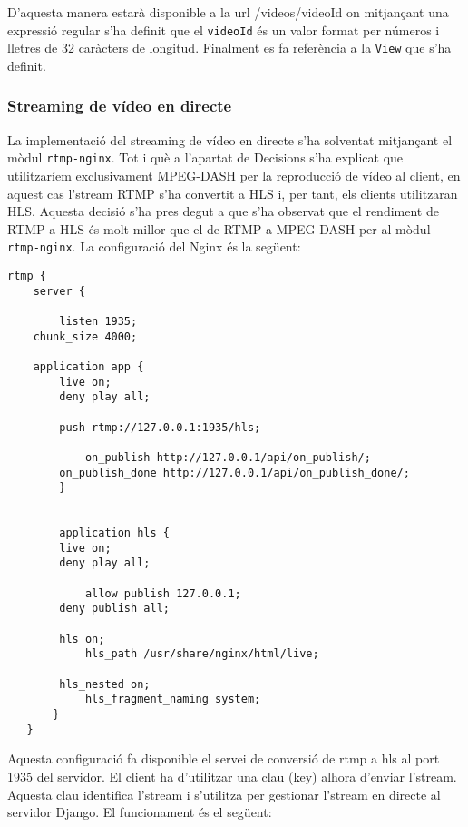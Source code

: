 \documentclass[12pt, titlepage]{article}
\begin{document}
D'aquesta manera estarà disponible a la url /videos/{videoId} on mitjançant una
expressió regular s'ha definit que el \verb|videoId| és un valor format per números
i lletres de 32 caràcters de longitud. Finalment es fa referència a la \verb|View| que
s'ha definit.

\subsubsection{Streaming de vídeo en directe}

La implementació del streaming de vídeo en directe s'ha solventat mitjançant el mòdul
\verb|rtmp-nginx|. Tot i què a l'apartat de Decisions s'ha explicat que utilitzaríem
exclusivament MPEG-DASH per la reproducció de vídeo al client, en aquest cas l'stream
RTMP s'ha convertit a HLS i, per tant, els clients utilitzaran HLS. Aquesta decisió
s'ha pres degut a que s'ha observat que el rendiment de RTMP a HLS és molt millor
que el de RTMP a MPEG-DASH per al mòdul \verb|rtmp-nginx|. La configuració del
Nginx és la següent:

\begin{lstlisting}[breaklines]
rtmp {
    server {

        listen 1935;
	chunk_size 4000;

	application app {
	    live on;
	    deny play all;

	    push rtmp://127.0.0.1:1935/hls;

            on_publish http://127.0.0.1/api/on_publish/;
	    on_publish_done http://127.0.0.1/api/on_publish_done/;
        }


        application hls {
	    live on;
	    deny play all;

            allow publish 127.0.0.1;
	    deny publish all;

	    hls on;
            hls_path /usr/share/nginx/html/live;

	    hls_nested on;
            hls_fragment_naming system;
       }
   }

\end{lstlisting}

Aquesta configuració fa disponible el servei de conversió de rtmp a hls al port
1935 del servidor. El client ha d'utilitzar una clau (key) alhora d'enviar l'stream.
Aquesta clau identifica l'stream i s'utilitza per gestionar l'stream en directe al
servidor Django. El funcionament és el següent:
\end{document}
